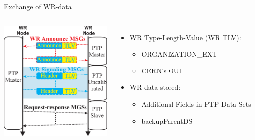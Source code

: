 \documentclass[compress,red]{beamer}
\begin{document}
\begin{frame}{Exchange of WR-data}

  \begin{columns}[c]

    \begin{center}
    \includegraphics[width=5.5cm]{protocol/WR-peer_recognision-1.pdf}
    \end{center}


      \begin{itemize}
	\item WR Type-Length-Value (WR TLV):
	  \begin{itemize}
	    \item ORGANIZATION\_EXT
	    \item CERN's OUI
	  \end{itemize}
 	\vspace{0.5cm}
	\item WR data stored:
	  \begin{itemize}
	    \item Additional Fields in PTP Data Sets
	    \item backupParentDS
	  \end{itemize}
      \end{itemize}

  \end{columns}


\end{frame}
\end{document}
